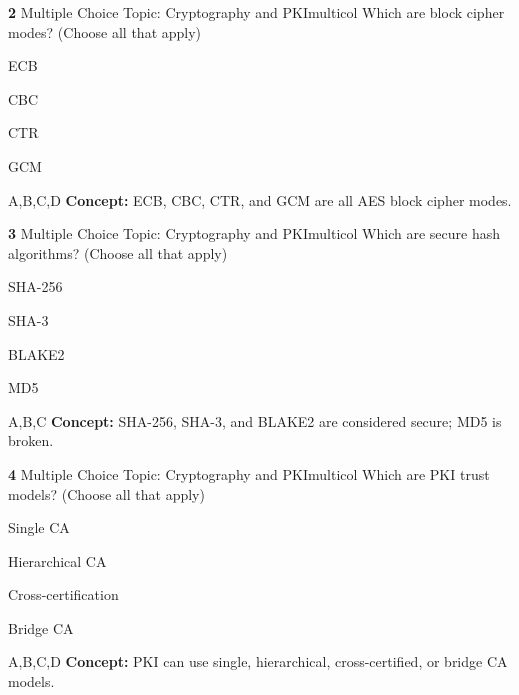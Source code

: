 \documentclass[10pt,a4paper]{article}
\begin{document}
\begin{qcard}{\color{white}\textbf{2} \hfill \small Multiple Choice \textbar{} Topic: Cryptography and PKI}{multicol}
Which are block cipher modes? (Choose all that apply)

\begin{qoptions}
\item ECB
\item CBC
\item CTR
\item GCM
\end{qoptions}
\begin{explainbox}{A,B,C,D}
\textbf{Concept:} ECB, CBC, CTR, and GCM are all AES block cipher modes.
\end{explainbox}
\end{qcard}

\begin{qcard}{\color{white}\textbf{3} \hfill \small Multiple Choice \textbar{} Topic: Cryptography and PKI}{multicol}
Which are secure hash algorithms? (Choose all that apply)

\begin{qoptions}
\item SHA-256
\item SHA-3
\item BLAKE2
\item MD5
\end{qoptions}
\begin{explainbox}{A,B,C}
\textbf{Concept:} SHA-256, SHA-3, and BLAKE2 are considered secure; MD5 is broken.
\end{explainbox}
\end{qcard}

\begin{qcard}{\color{white}\textbf{4} \hfill \small Multiple Choice \textbar{} Topic: Cryptography and PKI}{multicol}
Which are PKI trust models? (Choose all that apply)

\begin{qoptions}
\item Single CA
\item Hierarchical CA
\item Cross-certification
\item Bridge CA
\end{qoptions}
\begin{explainbox}{A,B,C,D}
\textbf{Concept:} PKI can use single, hierarchical, cross-certified, or bridge CA models.
\end{explainbox}
\end{qcard}
\end{document}
